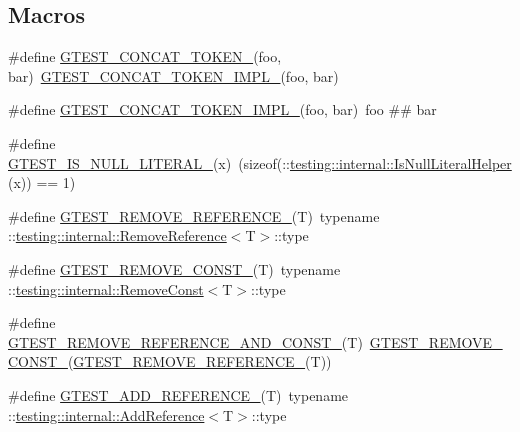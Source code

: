 \subsection*{Macros}
\begin{DoxyCompactItemize}
\item 
\#define \hyperlink{gtest-internal_8h_ae3c336cbe1ae2bd1b1d019333e4428a0}{G\+T\+E\+S\+T\+\_\+\+C\+O\+N\+C\+A\+T\+\_\+\+T\+O\+K\+E\+N\+\_\+}(foo,  bar)~\hyperlink{gtest-internal_8h_aa39fb5346d3573feebe4257cb3a01fde}{G\+T\+E\+S\+T\+\_\+\+C\+O\+N\+C\+A\+T\+\_\+\+T\+O\+K\+E\+N\+\_\+\+I\+M\+P\+L\+\_\+}(foo, bar)
\item 
\#define \hyperlink{gtest-internal_8h_aa39fb5346d3573feebe4257cb3a01fde}{G\+T\+E\+S\+T\+\_\+\+C\+O\+N\+C\+A\+T\+\_\+\+T\+O\+K\+E\+N\+\_\+\+I\+M\+P\+L\+\_\+}(foo,  bar)~foo \#\# bar
\item 
\#define \hyperlink{gtest-internal_8h_ae5dd8e23090e08856613878fa1ff6fca}{G\+T\+E\+S\+T\+\_\+\+I\+S\+\_\+\+N\+U\+L\+L\+\_\+\+L\+I\+T\+E\+R\+A\+L\+\_\+}(x)~(sizeof(\+::\hyperlink{namespacetesting_1_1internal_afb0731ba39ffef1fa1730ac0699c9025}{testing\+::internal\+::\+Is\+Null\+Literal\+Helper}(x)) == 1)
\item 
\#define \hyperlink{gtest-internal_8h_a84c72f25a6a6600e3ff8381ca6982ae9}{G\+T\+E\+S\+T\+\_\+\+R\+E\+M\+O\+V\+E\+\_\+\+R\+E\+F\+E\+R\+E\+N\+C\+E\+\_\+}(T)~typename \+::\hyperlink{structtesting_1_1internal_1_1RemoveReference}{testing\+::internal\+::\+Remove\+Reference}$<$T$>$\+::type
\item 
\#define \hyperlink{gtest-internal_8h_a2ffec8c60510eb130af387f5ce9a756a}{G\+T\+E\+S\+T\+\_\+\+R\+E\+M\+O\+V\+E\+\_\+\+C\+O\+N\+S\+T\+\_\+}(T)~typename \+::\hyperlink{structtesting_1_1internal_1_1RemoveConst}{testing\+::internal\+::\+Remove\+Const}$<$T$>$\+::type
\item 
\#define \hyperlink{gtest-internal_8h_a874567b176266188fabfffb8393267ce}{G\+T\+E\+S\+T\+\_\+\+R\+E\+M\+O\+V\+E\+\_\+\+R\+E\+F\+E\+R\+E\+N\+C\+E\+\_\+\+A\+N\+D\+\_\+\+C\+O\+N\+S\+T\+\_\+}(T)~\hyperlink{gtest-internal_8h_a2ffec8c60510eb130af387f5ce9a756a}{G\+T\+E\+S\+T\+\_\+\+R\+E\+M\+O\+V\+E\+\_\+\+C\+O\+N\+S\+T\+\_\+}(\hyperlink{gtest-internal_8h_a84c72f25a6a6600e3ff8381ca6982ae9}{G\+T\+E\+S\+T\+\_\+\+R\+E\+M\+O\+V\+E\+\_\+\+R\+E\+F\+E\+R\+E\+N\+C\+E\+\_\+}(T))
\item 
\#define \hyperlink{gtest-internal_8h_ab389953fc1f7e4efae30d182a0e0a13b}{G\+T\+E\+S\+T\+\_\+\+A\+D\+D\+\_\+\+R\+E\+F\+E\+R\+E\+N\+C\+E\+\_\+}(T)~typename \+::\hyperlink{structtesting_1_1internal_1_1AddReference}{testing\+::internal\+::\+Add\+Reference}$<$T$>$\+::type

\end{DoxyCompactItemize}
